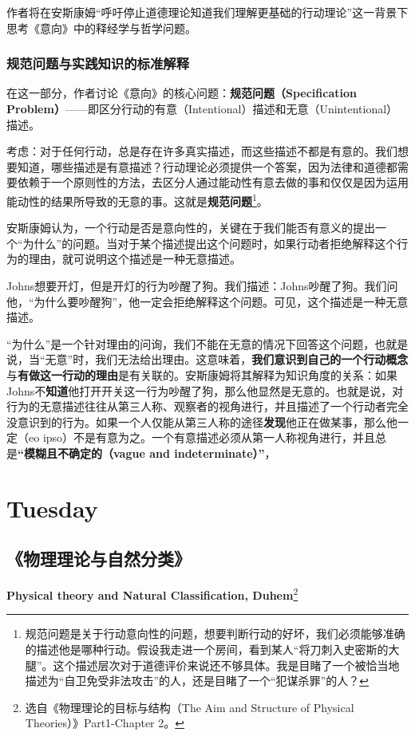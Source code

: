 \documentclass[12pt, a4paper, oneside]{ctexart}
\renewcommand{\b}{\textbf}
\newcommand{\f}{\footnote}
\begin{document}
作者将在安斯康姆“呼吁停止道德理论知道我们理解更基础的行动理论”这一背景下思考《意向》中的释经学与哲学问题。

\subsubsection{规范问题与实践知识的标准解释}
在这一部分，作者讨论《意向》的核心问题：\b{规范问题（Specification Problem）}——即区分行动的有意（Intentional）描述和无意（Unintentional）描述。

考虑：对于任何行动，总是存在许多真实描述，而这些描述不都是有意的。我们想要知道，哪些描述是有意描述？行动理论必须提供一个答案，因为法律和道德都需要依赖于一个原则性的方法，去区分人通过能动性有意去做的事和仅仅是因为运用能动性的结果所导致的无意的事。这就是\b{规范问题}\f{规范问题是关于行动意向性的问题，想要判断行动的好坏，我们必须能够准确的描述他是哪种行动。假设我走进一个房间，看到某人“将刀刺入史密斯的大腿”。这个描述层次对于道德评价来说还不够具体。我是目睹了一个被恰当地描述为“自卫免受非法攻击”的人，还是目睹了一个“犯谋杀罪”的人？}。

安斯康姆认为，一个行动是否是意向性的，关键在于我们能否有意义的提出一个“为什么”的问题。当对于某个描述提出这个问题时，如果行动者拒绝解释这个行为的理由，就可说明这个描述是一种无意描述。

Johns想要开灯，但是开灯的行为吵醒了狗。我们描述：Johns吵醒了狗。我们问他，“为什么要吵醒狗”，他一定会拒绝解释这个问题。可见，这个描述是一种无意描述。

“为什么”是一个针对理由的问询，我们不能在无意的情况下回答这个问题，也就是说，当“无意”时，我们无法给出理由。这意味着，\b{我们意识到自己的一个行动概念}与\b{有做这一行动的理由}是有关联的。安斯康姆将其解释为知识角度的关系：如果Johns不\b{知道}他打开开关这一行为吵醒了狗，那么他显然是无意的。也就是说，对行为的无意描述往往从第三人称、观察者的视角进行，并且描述了一个行动者完全没意识到的行为。如果一个人仅能从第三人称的途径\b{发现}他正在做某事，那么他一定（eo ipso）不是有意为之。一个有意描述必须从第一人称视角进行，并且总是\b{“模糊且不确定的（vague and indeterminate）”}，

\section{Tuesday}
\subsection{《物理理论与自然分类》}
\textbf{Physical theory and Natural Classification, Duhem}\f{选自《物理理论的目标与结构（The Aim and Structure of Physical Theories）》Part1-Chapter 2。}
\end{document}

